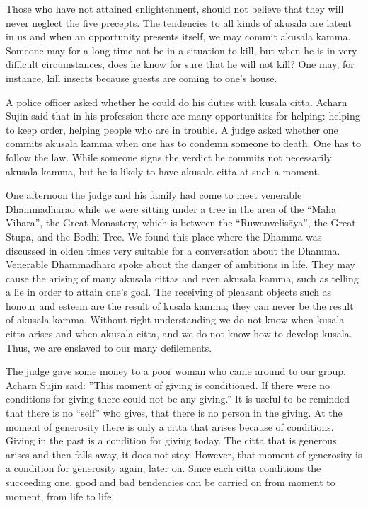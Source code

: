 Those who have not attained enlightenment, should not believe that they
will never neglect the five precepts. The tendencies to all kinds of
akusala are latent in us and when an opportunity presents itself, we may
commit akusala kamma. Someone may for a long time not be in a situation
to kill, but when he is in very difficult circumstances, does he know
for sure that he will not kill? One may, for instance, kill insects
because guests are coming to one's house.

A police officer asked whether he could do his duties with kusala citta.
Acharn Sujin said that in his profession there are many opportunities
for helping: helping to keep order, helping people who are in trouble. A
judge asked whether one commits akusala kamma when one has to condemn
someone to death. One has to follow the law. While someone signs the
verdict he commits not necessarily akusala kamma, but he is likely to
have akusala citta at such a moment.

One afternoon the judge and his family had come to meet venerable
Dhammadharao while we were sitting under a tree in the area of the
``Mahā Vihara'', the Great Monastery, which is between the
``Ruwanvelisāya'', the Great Stupa, and the Bodhi-Tree. We found this
place where the Dhamma was discussed in olden times very suitable for a
conversation about the Dhamma. Venerable Dhammadharo spoke about the
danger of ambitions in life. They may cause the arising of many akusala
cittas and even akusala kamma, such as telling a lie in order to attain
one's goal. The receiving of pleasant objects such as honour and esteem
are the result of kusala kamma; they can never be the result of akusala
kamma. Without right understanding we do not know when kusala citta
arises and when akusala citta, and we do not know how to develop kusala.
Thus, we are enslaved to our many defilements.

The judge gave some money to a poor woman who came around to our group.
Acharn Sujin said: ''This moment of giving is conditioned. If there were
no conditions for giving there could not be any giving.'' It is useful
to be reminded that there is no ``self'' who gives, that there is no
person in the giving. At the moment of generosity there is only a citta
that arises because of conditions. Giving in the past is a condition for
giving today. The citta that is generous arises and then falls away, it
does not stay. However, that moment of generosity is a condition for
generosity again, later on. Since each citta conditions the succeeding
one, good and bad tendencies can be carried on from moment to moment,
from life to life.

